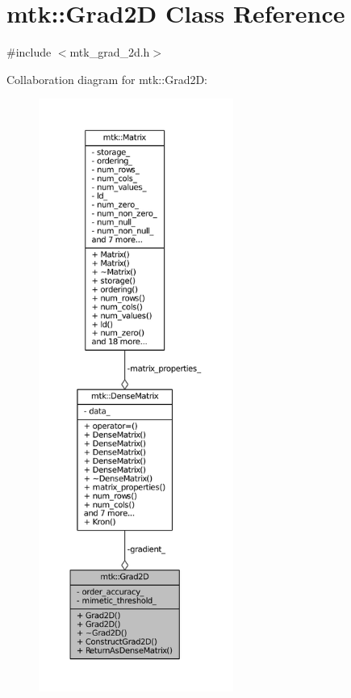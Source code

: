 \hypertarget{classmtk_1_1Grad2D}{\section{mtk\-:\-:Grad2\-D Class Reference}
\label{classmtk_1_1Grad2D}
}


{\ttfamily \#include $<$mtk\-\_\-grad\-\_\-2d.\-h$>$}



Collaboration diagram for mtk\-:\-:Grad2\-D\-:
\nopagebreak
\begin{figure}[H]
\begin{center}
\leavevmode
\includegraphics[height=550pt]{classmtk_1_1Grad2D__coll__graph}
\end{center}
\end{figure}
